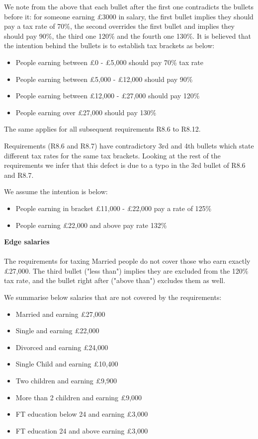 We note from the above that each bullet after the first one contradicts the bullets before it: for someone earning £3000 in salary, the first bullet implies they should pay a tax rate of 70\%, the second overrides the first bullet and implies they should pay 90\%, the third one 120\% and the fourth one 130\%. It is believed that the intention behind the bullets is to establish tax brackets as below: 
\begin{itemize}[noitemsep]
	\item People earning between £0 - £5,000 should pay 70\% tax rate 
	\item People earning between £5,000 - £12,000 should pay 90\%
	\item People earning between £12,000 - £27,000 should pay 120\%
	\item People earning over £27,000 should pay 130\%
\end{itemize}
The same applies for all subsequent requirements R8.6 to R8.12. 

Requirements (R8.6 and R8.7) have contradictory 3rd and 4th bullets which state different tax rates for the same tax brackets. Looking at the rest of the requirements we infer that this defect is due to a typo in the 3rd bullet of R8.6 and R8.7. 

We assume the intention is below: 
\begin{itemize}[noitemsep]
	\item People earning in bracket £11,000 - £22,000 pay a rate of 125\%
	\item People earning £22,000 and above pay rate 132\%
\end{itemize}

\textbf{Edge salaries\\}
\\
The requirements for taxing Married people do not cover those who earn exactly £27,000. The third bullet ("less than") implies they are excluded from the 120\% tax rate, and the bullet right after ("above than") excludes them as well. 
\par
We summarise below salaries that are not covered by the requirements:  
\begin{itemize}%
	\item Married and earning £27,000
	\item Single and earning £22,000
	\item Divorced and earning £24,000
	\item Single Child and earning £10,400
	\item Two children and earning £9,900
	\item More than 2 children and earning £9,000
	\item FT education below 24 and earning £3,000
	\item FT education 24 and above earning £3,000
\end{itemize}

